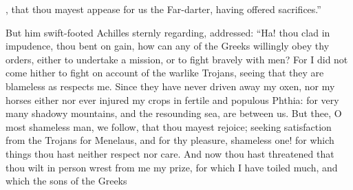 \documentclass{ransom}
\begin{document}
,
that thou mayest appease for us the Far-darter, having offered
sacrifices.”




But him swift-footed Achilles sternly regarding, addressed: “Ha!
thou clad in impudence, thou bent on gain, how can any of the Greeks
willingly obey thy orders, either to undertake a mission, or to fight
bravely with men? For I did not come hither to fight on account of the
warlike Trojans, seeing that they are blameless as respects me. Since
they have never driven away my oxen, nor my horses either nor ever
injured my crops in fertile and populous Phthia: for very many shadowy
mountains, and the resounding sea, are between us. But thee, O most
shameless man, we follow, that thou mayest rejoice; seeking
satisfaction from the Trojans for Menelaus, and for thy pleasure,
shameless one! for which things thou hast neither respect nor care. And
now thou hast threatened that thou wilt in person wrest from me my
prize, for which I have toiled much, and which the sons of the Greeks
\end{document}
